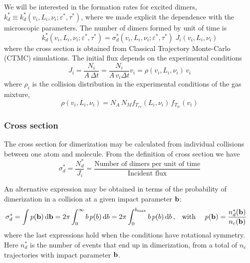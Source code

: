 We will be interested in the formation rates for excited dimers, $k_{d}^{*} \equiv k_{d}^{*}(v_{i}, L_{i}, \nu_{i} ; \varepsilon^{*}, \tau^{*})$, where we made explicit the dependence with the microscopic parameters. The number of dimers formed by unit of time is
\begin{equation}
  \label{Q:def-dimer-rate}
  k_{d}^{*}(v_{i}, L_{i}, \nu_{i} ; \varepsilon^{*}, \tau^{*}) = \sigma_{d}^{*}(v_{i}, L_{i}, \nu_{i} ; \varepsilon^{*}, \tau^{*}) \; J_{i}(v_{i}, L_{i}, \nu_{i} )
\end{equation}
where the cross section is obtained from Classical Trajectory Monte-Carlo (CTMC) simulations. The initial flux depends on the experimental conditions
\begin{equation}
  \label{Q:rates-flux}
  J_{i} =\frac{N_{i}}{A \,\Delta t} = \frac{N_{i}}{A \, v_{i} \Delta t} v_{i} = \rho(v_{i}, L_{i}, \nu_{i})\, v_{i}
\end{equation}
%
where $\rho_{i}$ is the collision distribution in the experimental conditions of the gas mixture,
\begin{equation}
  \label{Q:rates-def-collis-distrib}
  \rho(v_{i}, L_{i}, \nu_{i}) = N_{A} \, N_{M} f_{T_{rv}}(L_{i},\nu_{i}) \, f_{T_{tr}}(v_{i})
\end{equation}

\subsubsection{Cross section}
\label{S:cross-section}

The cross section for dimerization may be calculated from individual collisions between one atom and molecule. 
From the definition of cross section we have
\begin{equation*}
  \sigma_{d}^{*} = \frac{N_{d}^{*}}{J_{i}}= \frac{\text{Number of dimers per unit of time}}{\text{Incident flux}}
\end{equation*}

An alternative expression may be obtained in terms of the probability of dimerization in a collision at a given impact parameter $\mathbf{b}$:
\begin{align}
  \label{Q:rates-def-probab}
  \sigma_{d}^{*} = \int p(\mathbf{b})\,\mathrm{d} \mathbf{b} = 2 \pi \int_{0}^{\infty} b \, p(b) \,\mathrm{d} b = 2 \pi \int_{0}^{b_{\text{max}}} b \, p(b) \,\mathrm{d} b\,, & \quad \text{with } \quad  p(\mathbf{b}) = \frac{n_{d}^{*}(\mathbf{b})}{n_{c}(\mathbf{b})}
\end{align}
where the last expressions hold when the conditions have rotational symmetry. Here $n_{d}^{*}$ is the number of events that end up in dimerization, from a total of $n_{c}$ trajectories with impact parameter $\mathbf{b}$.

